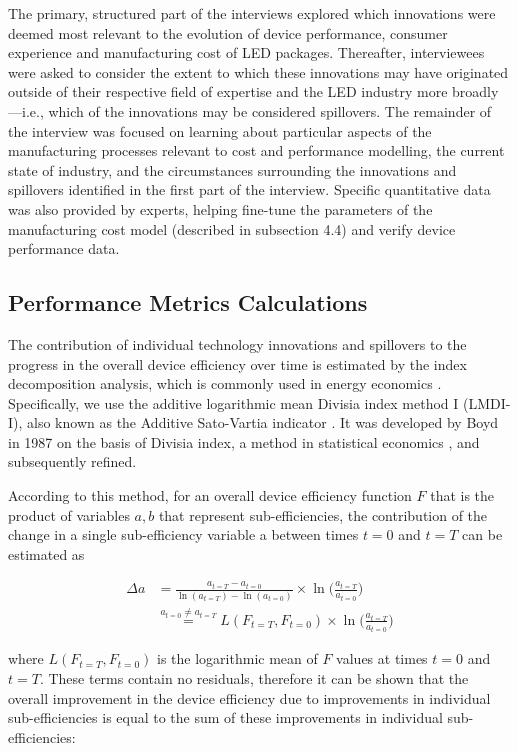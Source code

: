 \documentclass[twoside,twocolumn,9pt]{article}
\begin{document}
The primary, structured part of the interviews explored which innovations were deemed most relevant to the evolution of device performance, consumer experience and manufacturing cost of LED packages. Thereafter, interviewees were asked to consider the extent to which these innovations may have originated outside of their respective field of expertise and the LED industry more broadly—i.e., which of the innovations may be considered spillovers. The remainder of the interview was focused on learning about particular aspects of the manufacturing processes relevant to cost and performance modelling, the current state of industry, and the circumstances surrounding the innovations and spillovers identified in the first part of the interview. Specific quantitative data was also provided by experts, helping fine-tune the parameters of the manufacturing cost model (described in subsection 4.4) and verify device performance data.

\subsection{Performance Metrics Calculations}

The contribution of individual technology innovations and spillovers to the progress in the overall device efficiency over time is estimated by the index decomposition analysis, which is commonly used in energy economics \cite{Ang1997}. Specifically, we use the additive logarithmic mean Divisia index method I (LMDI-I), also known as the Additive Sato-Vartia indicator \cite{deBoer2019}. It was developed by Boyd in 1987 \cite{Boyd1987} on the basis of Divisia index, a method in statistical economics \cite{Diewert1988}, and subsequently refined.

According to this method, for an overall device efficiency function $F$ that is the product of variables $a, b$ that represent sub-efficiencies, the contribution of the change  in a single sub-efficiency variable a between times $t=0$ and $t=T$ can be estimated as \cite{Ang2019}

\begin{align}
    \Delta a &= \frac{a_{t=T} - a_{t=0}}{\ln(a_{t=T}) - \ln(a_{t=0})} \times \ln \big ( \frac{a_{t=T}}{a_{t=0}} \big ) \\
    & \stackrel{a_{t=0} \neq a_{t=T}}{=} L(F_{t=T}, F_{t=0}) \times \ln \big ( \frac{a_{t=T}}{a_{t=0}} \big )
\end{align}

where $L(F_{t=T}, F_{t=0})$ is the logarithmic mean of $F$ values at times $t=0$ and $t=T$. These terms contain no residuals, therefore it can be shown that the overall improvement in the device efficiency due to improvements in individual sub-efficiencies is equal to the sum of these improvements in individual sub-efficiencies: 
\end{document}
